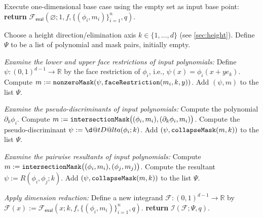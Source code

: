 \documentclass[onefignum,onetabnum,onealgnum,oneeqnum]{siamart190516}
\makeatletter
\newcommand{\R}{\mathbb R}
\newcommand{\circint}{\mathop{\mathpalette\docircint\relax}\!\int}
\newcommand{\docircint}[2]{%
  \ifx#1\displaystyle
    \displaycircint
  \else
    \normalcircint{#1}%
  \fi
}
\newcommand{\displaycircint}{\rotatebox{-11}{\scalebox{1.5}{$\diamond$}}\mkern-19mu}
\newcommand{\normalcircint}[1]{\smallerc{#1}\ifx#1\textstyle\mkern-11.1mu\else\mkern-10.6mu\fi}
\newcommand{\smallerc}[1]{\vcenter{\hbox{\rotatebox{-9}{\scalebox{\ifx#1\textstyle 1\else 0.75\fi}{$\diamond$}}}}}
\newcommand{\dotDelta}{{\vphantom{\Delta}\mathpalette\d@tD@lta\relax}}
\newcommand{\d@tD@lta}[2]{\ooalign{\hidewidth$\m@th#1\mkern-1mu\cdot$\hidewidth\cr$\m@th#1\Delta$\cr}}
\makeatother
\begin{document}
\begin{algorithm}[t]
\caption{\small Compute $\mathcal{I} (f; \{(\phi_i, m_i)\}_{i=1}^n, q)$. Given a list of multivariate polynomials $\phi_i : (0,1)^d \to \R$ and associated masks $m_i : {\mathbb N}_{\mathcal M}^d \to \{0,1\}$, a function $f : (0,1)^d \to \R$, and the order of quadrature $q$, approximate the volume integral $\circint_{(0,1)^d \setminus \Gamma} f(x)\,dx$, where $\Gamma := \bigcup_i \{\phi_i = 0\}$.}
\label{algo:main}
\begin{algorithmic}[1]

		\State Execute one-dimensional base case using the empty set as input base point:
		\State \textbf{return} ${\mathcal F}_\mathsf{eval}(\varnothing; 1, f, \{(\phi_i, m_i)\}_{i=1}^n, q)$.
	\EndIf
	
	\State Choose a height direction/elimination axis $k \in \{1, \ldots, d\}$ (see \cref{sec:height}). \label{algo:mainchoice}
	\State Define $\Psi$ to be a list of polynomial and mask pairs, initially empty.
	
	\Statex \textit{\hspace{-1em}Examine the lower and upper face restrictions of input polynomials:}	
			\State Define $\psi : (0,1)^{d-1} \to \R$ by the face restriction of $\phi_i$, i.e., $\psi(x) = \phi_i(x + y e_k)$.
			\State Compute $m := \verb|nonzeroMask|(\psi, \verb|faceRestriction|(m_i, k, y))$.
				\State Add $(\psi,m)$ to the list $\Psi$.
			\EndIf
		\EndFor		
	\EndFor
	
	\Statex \textit{\hspace{-1em}Examine the pseudo-discriminants of input polynomials:}
		\State Compute the polynomial $\partial_k \phi_i$.
		\State Compute $m := \verb|intersectionMask|\bigl((\phi_i, m_i), (\partial_k \phi_i, m_i)\bigr)$.
			\State Compute the pseudo-discriminant $\psi := \dotDelta(\phi_i; k)$.
			\State Add $(\psi, \verb|collapseMask|(m, k))$ to the list $\Psi$.
		\EndIf
	\EndFor
	
	\Statex \textit{\hspace{-1em}Examine the pairwise resultants of input polynomials:}
		\State Compute $m := \verb|intersectionMask|\bigl((\phi_i, m_i), (\phi_j, m_j)\bigr)$. 
			\State Compute the resultant $\psi := R(\phi_i, \phi_j; k)$.
			\State Add $(\psi, \verb|collapseMask|(m, k))$ to the list $\Psi$.
		\EndIf
	\EndFor
	
	\Statex \textit{\hspace{-1em}Apply dimension reduction:}
	\State Define a new integrand ${\mathcal F}: (0,1)^{d-1} \to \R$ by ${\mathcal F}(x) := {\mathcal F}_\mathsf{eval}(x; k, f, \{(\phi_i, m_i)\}_{i=1}^n, q)$.	\label{algo:mainintegranddef}
	\State \textbf{return} $\mathcal{I} ({\mathcal F}; \Psi, q)$.
	
	\end{algorithmic}
\end{algorithm}
\end{document}

